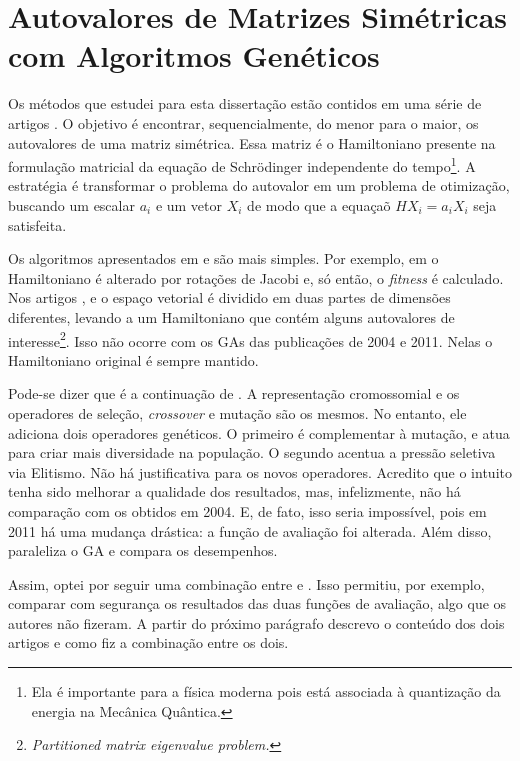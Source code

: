 \chapter{Autovalores de Matrizes Simétricas com Algoritmos Genéticos\label{sec:metodo}}

	Os métodos que estudei para esta dissertação estão contidos em uma série de artigos \cite{metodo2002, metodo2004, metodo2006, metodo2008, metodo2009, metodo2011}. O objetivo é encontrar, sequencialmente, do menor para o maior, os autovalores de uma matriz simétrica. Essa matriz é o Hamiltoniano presente na formulação matricial da equação de Schrödinger independente do tempo\footnote{Ela é importante para a física moderna pois está associada à quantização da energia na Mecânica Quântica.}. A estratégia é transformar o problema do autovalor em um problema de otimização, buscando um escalar $a_i$ e um vetor $X_i$ de modo que a equaçaõ $HX_i = a_iX_i$ seja satisfeita.
	
	Os algoritmos apresentados em \cite{metodo2004} e \cite{metodo2011} são mais simples. Por exemplo, em \cite{metodo2002} o Hamiltoniano é alterado por rotações de Jacobi e, só então, o \emph{fitness} é calculado. Nos artigos \cite{metodo2006}, \cite{metodo2008} e \cite{metodo2009} o espaço vetorial é dividido em duas partes de dimensões diferentes, levando a um Hamiltoniano que contém alguns autovalores de interesse\footnote{\emph{Partitioned matrix eigenvalue problem.}}. Isso não ocorre com os GAs das publicações de 2004 e 2011. Nelas o Hamiltoniano original é sempre mantido.
	
	Pode-se dizer que \cite{metodo2011} é a continuação de \cite{metodo2004}. A representação cromossomial e os operadores de seleção, \emph{crossover} e mutação são os mesmos. No entanto, ele adiciona dois operadores genéticos. O primeiro é complementar à mutação, e atua para criar mais diversidade na população. O segundo acentua a pressão seletiva via Elitismo. Não há justificativa para os novos operadores. Acredito que o intuito tenha sido melhorar a qualidade dos resultados, mas, infelizmente, não há comparação com os obtidos em 2004. E, de fato, isso seria impossível, pois em 2011 há uma mudança drástica: a função de avaliação foi alterada. Além disso, \cite{metodo2011} paraleliza o GA e compara os desempenhos.
	
	Assim, optei por seguir uma combinação entre \cite{metodo2004} e \cite{metodo2011}. Isso permitiu, por exemplo, comparar com segurança os resultados das duas funções de avaliação, algo que os autores não fizeram. A partir do próximo parágrafo descrevo o conteúdo dos dois artigos e como fiz a combinação entre os dois.

